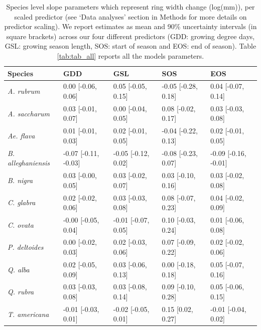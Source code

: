 \documentclass{article}\usepackage[]{graphicx}\usepackage[]{xcolor}
\begin{document}
\begin{table}[ht]
\centering
\caption{Species level slope parameters which represent ring width change (log(mm)), per scaled predictor (see `Data analyses' section in Methods for more details on predictor scaling). We report estimates as mean and 90\% uncertainty intervals (in square brackets) across our four different predictors (GDD: growing degree days, GSL: growing season length, SOS: start of season and EOS: end of season). Table \ref{tab:tab_all} reports all the models parameters.} 
\label{tab:ts_slope_table}
\begin{tabular}{lllll}
  \hline
Species & GDD & GSL & SOS & EOS \\ 
  \hline
\textit{A. rubrum} & 0.00 [-0.06, 0.06] & 0.05 [-0.05, 0.15] & -0.05 [-0.28, 0.18] & 0.04 [-0.07, 0.14] \\ 
  \textit{A. saccharum} & 0.03 [-0.01, 0.07] & 0.00 [-0.04, 0.05] & 0.08 [-0.02, 0.17] & 0.03 [-0.03, 0.08] \\ 
  \textit{Ae. flava} & 0.01 [-0.01, 0.03] & 0.02 [-0.01, 0.05] & -0.04 [-0.22, 0.13] & 0.02 [-0.01, 0.05] \\ 
  \textit{B. alleghaniensis} & -0.07 [-0.11, -0.03] & -0.05 [-0.12, 0.02] & -0.08 [-0.23, 0.07] & -0.09 [-0.16, -0.01] \\ 
  \textit{B. nigra} & 0.03 [-0.00, 0.05] & 0.03 [-0.02, 0.07] & 0.03 [-0.10, 0.16] & 0.03 [-0.02, 0.08] \\ 
  \textit{C. glabra} & 0.02 [-0.02, 0.06] & 0.03 [-0.03, 0.08] & 0.08 [-0.07, 0.23] & 0.04 [-0.02, 0.09] \\ 
  \textit{C. ovata} & -0.00 [-0.05, 0.04] & -0.01 [-0.07, 0.05] & 0.10 [-0.03, 0.24] & 0.01 [-0.06, 0.08] \\ 
  \textit{P. deltoides} & 0.00 [-0.02, 0.03] & 0.02 [-0.03, 0.06] & 0.07 [-0.09, 0.22] & 0.02 [-0.02, 0.06] \\ 
  \textit{Q. alba} & 0.02 [-0.05, 0.09] & 0.03 [-0.06, 0.13] & 0.00 [-0.18, 0.18] & 0.05 [-0.07, 0.16] \\ 
  \textit{Q. rubra} & 0.03 [-0.03, 0.08] & 0.03 [-0.08, 0.14] & 0.09 [-0.10, 0.28] & 0.05 [-0.06, 0.15] \\ 
  \textit{T. americana} & -0.01 [-0.03, 0.01] & -0.02 [-0.05, 0.01] & 0.15 [0.02, 0.27] & -0.01 [-0.04, 0.02] \\ 
   \hline
\end{tabular}
\end{table}
\end{document}
